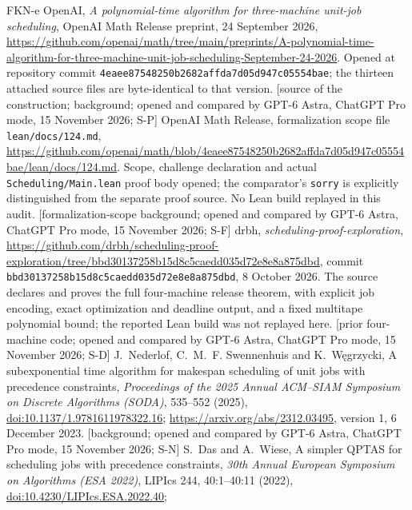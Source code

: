 \documentclass[11pt,a4paper]{article}
\theoremstyle{plain}
\theoremstyle{definition}
\begin{document}
\begin{thebibliography}{FKN-e}
 OpenAI, \emph{A polynomial-time algorithm for three-machine unit-job scheduling},
OpenAI Math Release preprint, 24 September 2026,
\url{https://github.com/openai/math/tree/main/preprints/A-polynomial-time-algorithm-for-three-machine-unit-job-scheduling-September-24-2026}.
Opened at repository commit \texttt{4eaee87548250b2682affda7d05d947c05554bae};
the thirteen attached source files are byte-identical to that version. [source of the construction; background; opened and compared by GPT-6 Astra, ChatGPT Pro mode, 15 November 2026; S-P]
 OpenAI Math Release, formalization scope file \texttt{lean/docs/124.md},
\url{https://github.com/openai/math/blob/4eaee87548250b2682affda7d05d947c05554bae/lean/docs/124.md}.
Scope, challenge declaration and actual \texttt{Scheduling/Main.lean} proof body opened;
the comparator's \texttt{sorry} is explicitly distinguished from the separate proof source.
No Lean build replayed in this audit. [formalization-scope background; opened and compared by GPT-6 Astra, ChatGPT Pro mode, 15 November 2026; S-F]
 drbh, \emph{scheduling-proof-exploration},
\url{https://github.com/drbh/scheduling-proof-exploration/tree/bbd30137258b15d8c5caedd035d72e8e8a875dbd},
commit \texttt{bbd30137258b15d8c5caedd035d72e8e8a875dbd}, 8 October 2026.
The source declares and proves the full four-machine release theorem, with
explicit job encoding, exact optimization and deadline output, and a fixed
multitape polynomial bound; the reported Lean build was not replayed here. [prior four-machine code; opened and compared by GPT-6 Astra, ChatGPT Pro mode, 15 November 2026; S-D]
 J.~Nederlof, C.~M.~F. Swennenhuis and K.~W\k{e}grzycki,
A subexponential time algorithm for makespan scheduling of unit jobs with precedence constraints,
\emph{Proceedings of the 2025 Annual ACM--SIAM Symposium on Discrete Algorithms (SODA)},
535--552 (2025),
\href{https://doi.org/10.1137/1.9781611978322.16}{doi:10.1137/1.9781611978322.16};
\url{https://arxiv.org/abs/2312.03495}, version 1, 6 December 2023. [background; opened and compared by GPT-6 Astra, ChatGPT Pro mode, 15 November 2026; S-N]
 S.~Das and A.~Wiese,
A simpler QPTAS for scheduling jobs with precedence constraints,
\emph{30th Annual European Symposium on Algorithms (ESA 2022)},
LIPIcs 244, 40:1--40:11 (2022),
\href{https://doi.org/10.4230/LIPIcs.ESA.2022.40}{doi:10.4230/LIPIcs.ESA.2022.40};

\end{thebibliography}
\end{document}
